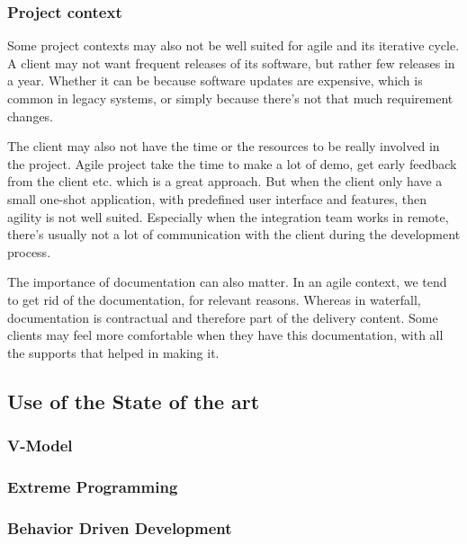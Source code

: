 \subsubsection{Project context}
Some project contexts may also not be well suited for agile and its iterative
cycle.
A client may not want frequent releases of its software, but rather few
releases in a year.
Whether it can be because software updates are expensive, which is common in
legacy systems, or simply because there's not that much requirement changes.

The client may also not have the time or the resources to be really involved
in the project.
Agile project take the time to make a lot of demo, get early feedback from
the client etc.
which is a great approach.
But when the client only have a small one-shot application, with predefined
user interface and features, then agility is not well suited.
Especially when the integration team works in remote, there's usually not a
lot of communication with the client during the development process.

The importance of documentation can also matter.
In an agile context, we tend to get rid of the documentation, for relevant
reasons.
Whereas in waterfall, documentation is contractual and therefore part of the
delivery content.
Some clients may feel more comfortable when they have this documentation,
with all the supports that helped in making it.

\subsection{Use of the State of the art}\label{subsec:use-of-the-state-of-the-art}

\subsubsection{V-Model}

\subsubsection{Extreme Programming}

\subsubsection{Behavior Driven Development}
